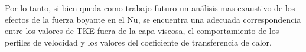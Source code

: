 Por lo tanto, si bien queda como trabajo futuro un análisis mas exaustivo de los efectos de la fuerza boyante en el Nu, se encuentra una adecuada correspondencia entre los valores de TKE fuera de la capa viscosa, el comportamiento de los perfiles de velocidad y los valores del coeficiente de transferencia de calor.





